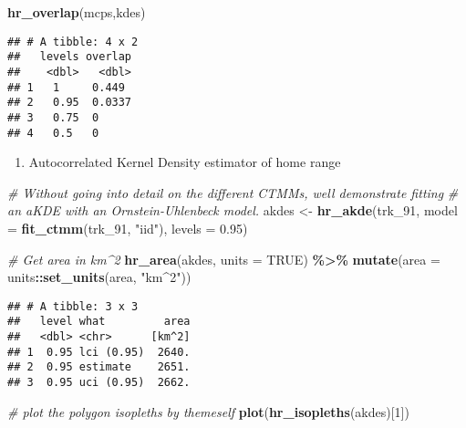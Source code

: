 \documentclass[
]{article}
\newenvironment{Shaded}{\begin{snugshade}}{\end{snugshade}}
\newcommand{\AttributeTok}[1]{\textcolor[rgb]{0.13,0.29,0.53}{#1}}
\newcommand{\CommentTok}[1]{\textcolor[rgb]{0.56,0.35,0.01}{\textit{#1}}}
\newcommand{\ConstantTok}[1]{\textcolor[rgb]{0.56,0.35,0.01}{#1}}
\newcommand{\DecValTok}[1]{\textcolor[rgb]{0.00,0.00,0.81}{#1}}
\newcommand{\FloatTok}[1]{\textcolor[rgb]{0.00,0.00,0.81}{#1}}
\newcommand{\FunctionTok}[1]{\textcolor[rgb]{0.13,0.29,0.53}{\textbf{#1}}}
\newcommand{\NormalTok}[1]{#1}
\newcommand{\OtherTok}[1]{\textcolor[rgb]{0.56,0.35,0.01}{#1}}
\newcommand{\SpecialCharTok}[1]{\textcolor[rgb]{0.81,0.36,0.00}{\textbf{#1}}}
\newcommand{\StringTok}[1]{\textcolor[rgb]{0.31,0.60,0.02}{#1}}
\providecommand{\tightlist}{%
  \setlength{\itemsep}{0pt}\setlength{\parskip}{0pt}}
\begin{document}
\begin{Shaded}
\begin{Highlighting}[]
\FunctionTok{hr\_overlap}\NormalTok{(mcps,kdes)}
\end{Highlighting}
\end{Shaded}

\begin{verbatim}
## # A tibble: 4 x 2
##   levels overlap
##    <dbl>   <dbl>
## 1   1     0.449 
## 2   0.95  0.0337
## 3   0.75  0     
## 4   0.5   0
\end{verbatim}

\begin{enumerate}
\def\labelenumi{\alph{enumi}.}
\setcounter{enumi}{2}
\tightlist
\item
  Autocorrelated Kernel Density estimator of home range
\end{enumerate}

\begin{Shaded}
\begin{Highlighting}[]
\CommentTok{\# Without going into detail on the different CTMMs, we\textquotesingle{}ll demonstrate fitting}
\CommentTok{\# an aKDE with an Ornstein{-}Uhlenbeck model.}
\NormalTok{akdes }\OtherTok{\textless{}{-}} \FunctionTok{hr\_akde}\NormalTok{(trk\_91, }\AttributeTok{model =} \FunctionTok{fit\_ctmm}\NormalTok{(trk\_91, }\StringTok{"iid"}\NormalTok{), }\AttributeTok{levels =} \FloatTok{0.95}\NormalTok{)}

\CommentTok{\# Get area in km\^{}2}
\FunctionTok{hr\_area}\NormalTok{(akdes, }\AttributeTok{units =} \ConstantTok{TRUE}\NormalTok{) }\SpecialCharTok{\%\textgreater{}\%} 
  \FunctionTok{mutate}\NormalTok{(}\AttributeTok{area =}\NormalTok{ units}\SpecialCharTok{::}\FunctionTok{set\_units}\NormalTok{(area, }\StringTok{"km\^{}2"}\NormalTok{))}
\end{Highlighting}
\end{Shaded}

\begin{verbatim}
## # A tibble: 3 x 3
##   level what         area
##   <dbl> <chr>      [km^2]
## 1  0.95 lci (0.95)  2640.
## 2  0.95 estimate    2651.
## 3  0.95 uci (0.95)  2662.
\end{verbatim}

\begin{Shaded}
\begin{Highlighting}[]
\CommentTok{\# plot the polygon isopleths by themeself}
\FunctionTok{plot}\NormalTok{(}\FunctionTok{hr\_isopleths}\NormalTok{(akdes)[}\DecValTok{1}\NormalTok{])}
\end{Highlighting}
\end{Shaded}
\end{document}
